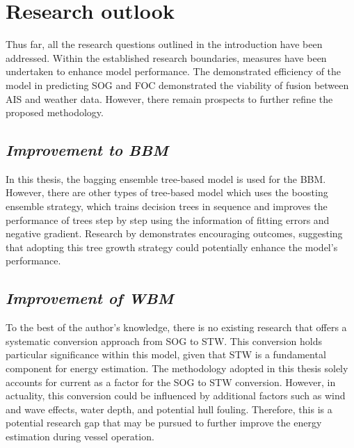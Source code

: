 \pagebreak

\section{Research outlook}\label{sec:research_outlook}

Thus far, all the research questions outlined in the introduction have been addressed. Within the established research boundaries, measures have been undertaken to enhance model performance. The demonstrated efficiency of the model in predicting SOG and FOC demonstrated the viability of fusion between AIS and weather data. However, there remain prospects to further refine the proposed methodology.\\

\subsection*{\emph{Improvement to BBM}}

In this thesis, the bagging ensemble tree-based model is used for the BBM. However, there are other types of tree-based model which uses the boosting ensemble strategy, which trains decision trees in sequence and improves the performance of trees step by step using the information of fitting errors and negative gradient. Research by  demonstrates encouraging outcomes, suggesting that adopting this tree growth strategy could potentially enhance the model's performance.\\


\subsection*{\emph{Improvement of WBM}}

To the best of the author's knowledge, there is no existing research that offers a systematic conversion approach from SOG to STW. This conversion holds particular significance within this model, given that STW is a fundamental component for energy estimation. The methodology adopted in this thesis solely accounts for current as a factor for the SOG to STW conversion. However, in actuality, this conversion could be influenced by additional factors such as wind and wave effects, water depth, and potential hull fouling. Therefore, this is a potential research gap that may be pursued to further improve the energy estimation during vessel operation.\\ 

